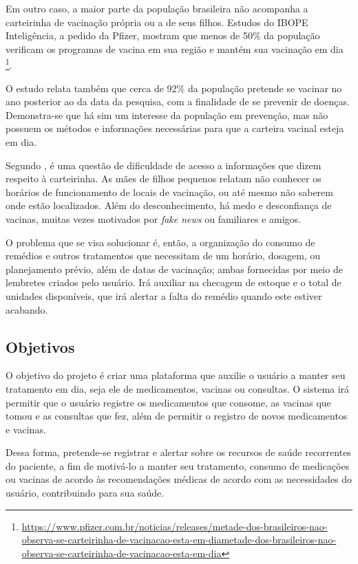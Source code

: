\documentclass[
	article,			%
	12pt,				%
	oneside,			%
	a4paper,			%
    BIBLATEX,           %
	english,			%
	brazil,				%
	sumario=tradicional
	]{abntex2}
\begin{document}
Em outro caso, a maior parte da população brasileira não acompanha a carteirinha de vacinação própria ou a de seus filhos. Estudos do IBOPE Inteligência, a pedido da Pfizer, mostram que menos de 50\% da população verificam os programas de vacina em sua região e mantém sua vacinação em dia \footnote{\url{https://www.pfizer.com.br/noticias/releases/metade-dos-brasileiros-nao-observa-se-carteirinha-de-vacinacao-esta-em-diametade-dos-brasileiros-nao-observa-se-carteirinha-de-vacinacao-esta-em-dia}}.

O estudo relata também que cerca de 92\% da população pretende se vacinar no ano posterior ao da data da pesquisa, com a finalidade de se prevenir de doenças. Demonstra-se que há sim um interesse da população em prevenção, mas não possuem os métodos e informações necessárias para que a carteira vacinal esteja em dia.

Segundo , é uma questão de dificuldade de acesso a informações que dizem respeito à carteirinha. As mães de filhos pequenos relatam não conhecer os horários de funcionamento de locais de vacinação, ou até mesmo não saberem onde estão localizados. Além do desconhecimento, há medo e desconfiança de vacinas, muitas vezes motivados por \textit{fake news} ou familiares e amigos.

O problema que se visa solucionar é, então, a organização do consumo de remédios e outros tratamentos que necessitam de um horário, dosagem, ou planejamento prévio, além de datas de vacinação; ambas fornecidas por meio de lembretes criados pelo usuário. Irá auxiliar na checagem de estoque e o total de unidades disponíveis, que irá alertar a falta do remédio quando este estiver acabando.


\subsection{Objetivos}

O objetivo do projeto é criar uma plataforma que auxilie o usuário a manter seu tratamento em dia, seja ele de medicamentos, vacinas ou consultas. O sistema irá permitir que o usuário registre os medicamentos que consome, as vacinas que tomou e as consultas que fez, além de permitir o registro de novos medicamentos e vacinas.

Dessa forma, pretende-se registrar e alertar sobre os recursos de saúde recorrentes do paciente, a fim de motivá-lo a manter seu tratamento, consumo de medicações ou vacinas de acordo às recomendações médicas de acordo com as necessidades do usuário, contribuindo para sua saúde.
\end{document}
